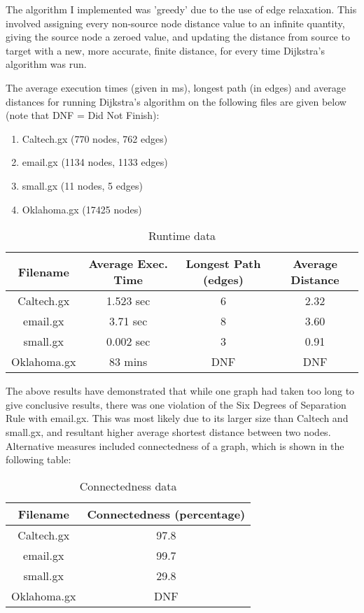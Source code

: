 \documentclass{article}
\begin{document}
\noindent The algorithm I implemented was 'greedy' due to the use of edge
relaxation. This involved assigning every non-source node distance value to an
infinite quantity, giving the source node a zeroed value, and updating the
distance from source to target with a new, more accurate, finite distance, for
every time Dijkstra's algorithm was run. \par

\noindent The average execution times (given in ms), longest path (in edges)
and average distances for running Dijkstra's algorithm on the following files
are given below (note that DNF = Did Not Finish):
\begin{enumerate}
\item Caltech.gx (770 nodes, 762 edges)
\item email.gx (1134 nodes, 1133 edges)
\item small.gx (11 nodes, 5 edges)
\item Oklahoma.gx (17425 nodes)
\end{enumerate}

\begin{table}[ht]
\caption{Runtime data}
\centering
\begin{tabular}{c c c c}
\hline\hline
Filename & Average Exec. Time & Longest Path (edges) & Average Distance \\ [0.5ex]
\hline
Caltech.gx & 1.523 sec & 6 & 2.32  \\
email.gx & 3.71 sec & 8 & 3.60  \\
small.gx & 0.002 sec & 3 & 0.91  \\
Oklahoma.gx & 83 mins & DNF & DNF  \\ [1ex]
\hline
\end{tabular}
\label{table:runtime}
\end{table}

\noindent The above results have demonstrated that while one graph had taken
too long to give conclusive results, there was one violation of the Six
Degrees of Separation Rule with email.gx. This was most likely due to its
larger size than Caltech and small.gx, and resultant higher average shortest
distance between two nodes. Alternative measures included connectedness of a
graph, which is shown in the following table:

\begin{table}[ht]
\caption{Connectedness data}
\centering
\begin{tabular}{c c}
\hline\hline
Filename & Connectedness (percentage) \\ [0.5ex]
\hline
Caltech.gx & 97.8  \\
email.gx & 99.7 \\
small.gx & 29.8 \\
Oklahoma.gx & DNF \\ [1ex]
\hline
\end{tabular}
\label{table:connect}
\end{table}
\end{document}
